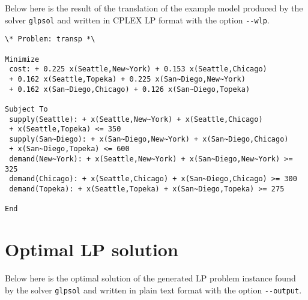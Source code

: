 \documentclass[11pt]{report}
\begin{document}
Below here is the result of the translation of the example model
produced by the solver \verb|glpsol| and written in CPLEX LP format
with the option \verb|--wlp|.

\medskip

\begin{verbatim}
\* Problem: transp *\

Minimize
 cost: + 0.225 x(Seattle,New~York) + 0.153 x(Seattle,Chicago)
 + 0.162 x(Seattle,Topeka) + 0.225 x(San~Diego,New~York)
 + 0.162 x(San~Diego,Chicago) + 0.126 x(San~Diego,Topeka)

Subject To
 supply(Seattle): + x(Seattle,New~York) + x(Seattle,Chicago)
 + x(Seattle,Topeka) <= 350
 supply(San~Diego): + x(San~Diego,New~York) + x(San~Diego,Chicago)
 + x(San~Diego,Topeka) <= 600
 demand(New~York): + x(Seattle,New~York) + x(San~Diego,New~York) >= 325
 demand(Chicago): + x(Seattle,Chicago) + x(San~Diego,Chicago) >= 300
 demand(Topeka): + x(Seattle,Topeka) + x(San~Diego,Topeka) >= 275

End
\end{verbatim}

\section{Optimal LP solution}

Below here is the optimal solution of the generated LP problem instance
found by the solver \verb|glpsol| and written in plain text format
with the option \verb|--output|.

\medskip
\end{document}

